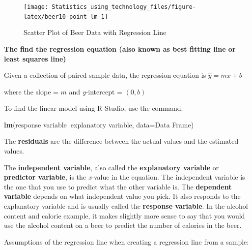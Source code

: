 \documentclass[
]{book}
\newenvironment{Shaded}{\begin{snugshade}}{\end{snugshade}}
\newcommand{\DataTypeTok}[1]{\textcolor[rgb]{0.13,0.29,0.53}{#1}}
\newcommand{\KeywordTok}[1]{\textcolor[rgb]{0.13,0.29,0.53}{\textbf{#1}}}
\newcommand{\NormalTok}[1]{#1}
\newcommand{\OperatorTok}[1]{\textcolor[rgb]{0.81,0.36,0.00}{\textbf{#1}}}
\newcommand{\StringTok}[1]{\textcolor[rgb]{0.31,0.60,0.02}{#1}}
\begin{document}
\begin{Shaded}
\end{Shaded}

\begin{figure}
\texttt{[image: Statistics\_using\_technology\_files/figure-latex/beer10-point-lm-1]} \caption{Scatter Plot of Beer Data with Regression Line}\label{fig:beer10-point-lm}
\end{figure}

\textbf{The find the regression equation (also known as best fitting line or least squares line)}

Given a collection of paired sample data, the regression equation is \(\hat{y}=mx+b\)

where the slope = \(m\) and \emph{y}-intercept = \((0,b)\)

To find the linear model using R Studio, use the command:

\begin{Shaded}
\begin{Highlighting}[]
\KeywordTok{lm}\NormalTok{(response variable}\OperatorTok{~}\NormalTok{explanatory variable, }\DataTypeTok{data=}\NormalTok{Data Frame)}
\end{Highlighting}
\end{Shaded}

The \textbf{residuals} are the difference between the actual values and the estimated values.

The \textbf{independent variable}, also called the \textbf{explanatory variable} or \textbf{predictor variable}, is the \emph{x}-value in the equation. The independent variable is the one that you use to predict what the other variable is. The \textbf{dependent variable} depends on what independent value you pick. It also responds to the explanatory variable and is usually called the \textbf{response variable}. In the alcohol content and calorie example, it makes slightly more sense to say that you would use the alcohol content on a beer to predict the number of calories in the beer.

Assumptions of the regression line when creating a regression line from a sample:
\end{document}
